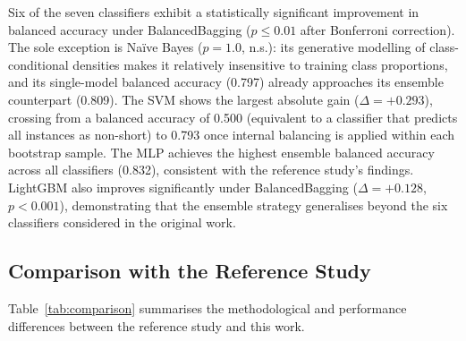 \documentclass[a4paper,twoside]{article}
\begin{document}
Six of the seven classifiers exhibit a statistically significant improvement in
balanced accuracy under BalancedBagging ($p \leq 0.01$ after Bonferroni
correction). The sole exception is Naïve Bayes ($p = 1.0$, n.s.): its
generative modelling of class-conditional densities makes it relatively
insensitive to training class proportions, and its single-model balanced accuracy
(0.797) already approaches its ensemble counterpart (0.809). The SVM shows the
largest absolute gain ($\Delta = +0.293$), crossing from a balanced accuracy of
0.500 (equivalent to a classifier that predicts all instances as non-short) to
0.793 once internal balancing is applied within each bootstrap sample. The MLP
achieves the highest ensemble balanced accuracy across all classifiers (0.832),
consistent with the reference study's findings. LightGBM also improves
significantly under BalancedBagging ($\Delta = +0.128$, $p < 0.001$),
demonstrating that the ensemble strategy generalises beyond the six classifiers
considered in the original work.

\subsection{Comparison with the Reference Study}

Table~\ref{tab:comparison} summarises the methodological and performance differences
between the reference study and this work.

\begin{table}[ht!]
  \centering
  \caption{Direct comparison between Papaiz et al.~\cite{Papaiz2024} and this work.
    \textsuperscript{a}Best ensemble balanced accuracy reported under repeated CV.
    \textsuperscript{b}Not reported in the reference study.}
  \label{tab:comparison}
\end{table}
\end{document}
